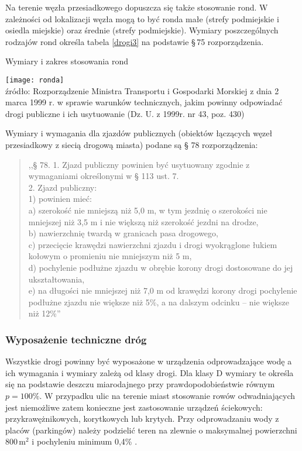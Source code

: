 \documentclass[twoside,12pt]{article}
\begin{document}
	Na terenie węzła przesiadkowego dopuszcza się także stosowanie rond. W zależności od lokalizacji węzła mogą to być ronda małe (strefy podmiejskie i osiedla miejskie) oraz średnie (strefy podmiejskie). Wymiary poszczególnych rodzajów rond określa tabela \ref{drogi3} na podstawie §\,75 rozporządzenia.
		\begin{table}[H]
		\centering
		\caption{Wymiary i zakres stosowania rond}
		\texttt{[image: ronda]}\\
		\footnotesize{źródło: Rozporządzenie Ministra Transportu i Gospodarki Morskiej z dnia 2 marca 1999 r. w sprawie warunków technicznych, jakim powinny odpowiadać drogi publiczne i ich usytuowanie (Dz. U. z 1999r. nr 43, poz. 430) \cite{rozporzadzenie_drogi}}
		\label{drogi3}
	\end{table}	
	
	Wymiary i wymagania dla zjazdów publicznych (obiektów łączących węzeł przesiadkowy z siecią drogową miasta) podane są § 78 rozporządzenia:
	\begin{quote}
	,,§ 78. 1. Zjazd publiczny powinien być usytuowany zgodnie z wymaganiami określonymi w § 113 ust. 7.\\
2. Zjazd publiczny:\\
1) powinien mieć:\\
a) szerokość nie mniejszą niż 5,0 m, w tym jezdnię o szerokości nie mniejszej niż 3,5 m i nie większą niż szerokość
jezdni na drodze,\\
b) nawierzchnię twardą w granicach pasa drogowego,\\
c) przecięcie krawędzi nawierzchni zjazdu i drogi wyokrąglone łukiem kołowym o promieniu nie mniejszym niż 5 m,\\
d) pochylenie podłużne zjazdu w obrębie korony drogi dostosowane do jej ukształtowania,\\
e) na długości nie mniejszej niż 7,0 m od krawędzi korony drogi pochylenie podłużne zjazdu nie większe niż 5\%,
a na dalszym odcinku – nie większe niż 12\%'' \cite{rozporzadzenie_drogi}
	\end{quote}
	
	\subsubsection{Wyposażenie techniczne dróg} 

	Wszystkie drogi powinny być wyposażone w urządzenia odprowadzające wodę a ich wymagania i wymiary zależą od klasy drogi. Dla klasy D wymiary te określa się na podstawie deszczu miarodajnego przy prawdopodobieństwie równym $p=100\%$. W przypadku ulic na terenie miast stosowanie rowów odwadniających jest niemożliwe zatem konieczne jest zastosowanie urządzeń ściekowych: przykrawężnikowych, korytkowych lub krytych. Przy odprowadzaniu wody z placów (parkingów) należy podzielić teren na zlewnie o maksymalnej powierzchni 800\,m$^2$ i pochyleniu minimum 0,4\% \cite{rozporzadzenie_drogi}.
	
\end{document}
